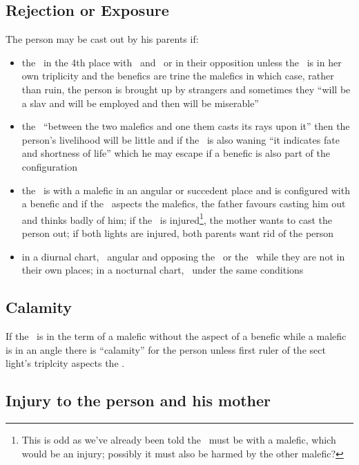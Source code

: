 \subsection{Rejection or Exposure}
The person may be cast out by his parents if:
\begin{itemize}
\item the \Moon\, in the 4th place with \Saturn\, and \Mars\, or in their opposition unless the \Moon\, is in her own triplicity and the benefics are trine the malefics in which case, rather than ruin, the person is brought up by strangers and sometimes they ``will be a slav and will be employed and then will be miserable''

\item the \Moon\, ``between the two malefics and one them casts its rays upon it'' then the person's livelihood will be little and if the \Moon\, is also waning ``it indicates fate and shortness of life'' which he may escape if a benefic is also part of the configuration

\item the \Moon\, is with a malefic in an angular or succedent place and is configured with a benefic and if the \Sun\, aspects the malefics, the father favours casting him out and thinks badly of him; if the \Moon\, is injured\footnote{This is odd as we've already been told the \Moon\, must be with a malefic, which would be an injury; possibly it must also be harmed by the other malefic?}, the mother wants to cast the person out; if both lights are injured, both parents want rid of the person

\item in a diurnal chart, \Mars\, angular and opposing the \Moon\, or the \Sun\, while they are not in their own places; in a nocturnal chart, \Saturn\, under the same conditions
\end{itemize}

\subsection{Calamity}

If the \Moon\, is in the term of a malefic without the aspect of a benefic while a malefic is in an angle there is ``calamity'' for the person unless first ruler of the sect light's triplcity aspects the \Moon.

\subsection{Injury to the person and his mother}

